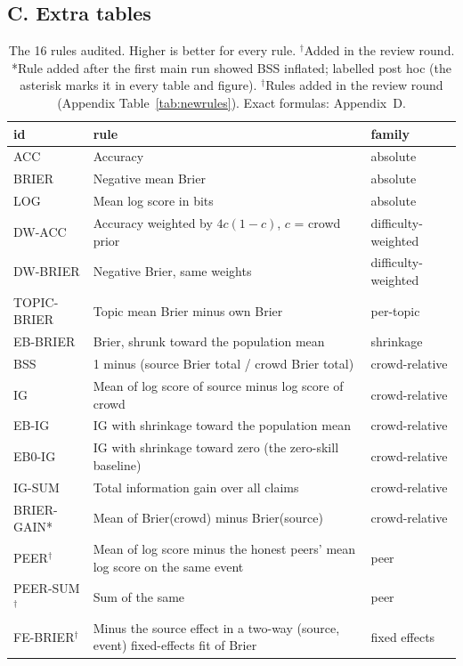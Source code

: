 \documentclass[10pt]{article}
\begin{document}
\subsection*{C. Extra tables}

\begin{table}[!ht]
\centering\small
\caption{The 16 rules audited. Higher is better for every rule. $^\dagger$Added in the review round. *Rule added after the first main run showed BSS inflated; labelled post hoc (the asterisk marks it in every table and figure). $^\dagger$Rules added in the review round (Appendix Table~\ref{tab:newrules}). Exact formulas: Appendix~D.}
\label{tab:rules}
\begin{tabular}{@{}lll@{}}
\toprule
id & rule & family \\
\midrule
ACC & Accuracy & absolute \\
BRIER & Negative mean Brier & absolute \\
LOG & Mean log score in bits & absolute \\
DW-ACC & Accuracy weighted by $4c(1-c)$, $c$ = crowd prior & difficulty-weighted \\
DW-BRIER & Negative Brier, same weights & difficulty-weighted \\
TOPIC-BRIER & Topic mean Brier minus own Brier & per-topic \\
EB-BRIER & Brier, shrunk toward the population mean & shrinkage \\
BSS & 1 minus (source Brier total / crowd Brier total) & crowd-relative \\
IG & Mean of log score of source minus log score of crowd & crowd-relative \\
EB-IG & IG with shrinkage toward the population mean & crowd-relative \\
EB0-IG & IG with shrinkage toward zero (the zero-skill baseline) & crowd-relative \\
IG-SUM & Total information gain over all claims & crowd-relative \\
BRIER-GAIN* & Mean of Brier(crowd) minus Brier(source) & crowd-relative \\
PEER$^\dagger$ & Mean of log score minus the honest peers' mean log score on the same event & peer \\
PEER-SUM$^\dagger$ & Sum of the same & peer \\
FE-BRIER$^\dagger$ & Minus the source effect in a two-way (source, event) fixed-effects fit of Brier & fixed effects \\
\bottomrule
\end{tabular}
\end{table}
\end{document}
